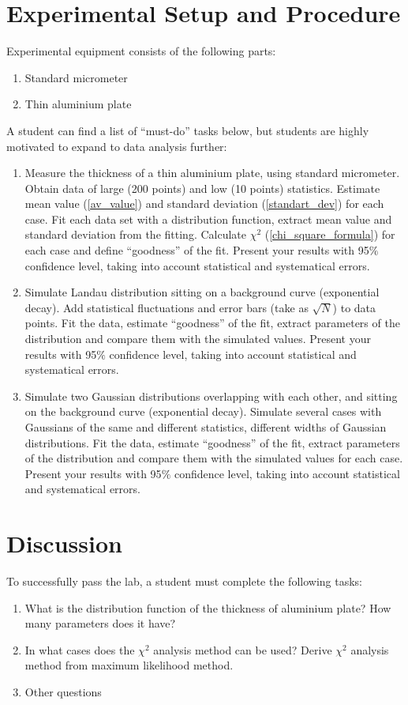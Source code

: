 \documentclass[12pt,a4paper]{report}
\begin{document}
\section{Experimental Setup and Procedure}
Experimental equipment consists of the following parts:
\begin{enumerate}
\item Standard micrometer
\item Thin aluminium plate
\end{enumerate}
A student can find a list of \enquote{must-do} tasks below, but students are highly motivated to expand to data analysis further:

\begin{enumerate}
\item Measure the thickness of a thin aluminium plate, using standard micrometer. Obtain data of large (200 points) and low (10 points) statistics. Estimate mean value (\ref{av_value}) and standard deviation (\ref{standart_dev}) for each case. Fit each data set with a distribution function, extract mean value and standard deviation from the fitting. Calculate $\chi^2$ (\ref{chi_square_formula}) for each case and define \enquote{goodness} of the fit. Present your results with 95$\%$ confidence level, taking into account statistical and systematical errors. 
\item Simulate Landau distribution sitting on a background curve (exponential decay). Add statistical fluctuations and error bars (take as $\sqrt{N}$) to data points. Fit the data, estimate \enquote{goodness} of the fit, extract parameters of the distribution and compare them with the simulated values. Present your results with 95$\%$ confidence level, taking into account statistical and systematical errors.
\item Simulate two Gaussian distributions overlapping with each other, and sitting on the background curve (exponential decay). Simulate several cases with Gaussians of the same and different statistics, different widths of Gaussian distributions. Fit the data, estimate \enquote{goodness} of the fit, extract parameters of the distribution and compare them with the simulated values for each case. Present your results with 95$\%$ confidence level, taking into account statistical and systematical errors.
\end{enumerate}

\section{Discussion}
To successfully pass the lab, a student must complete the following tasks:
\begin{enumerate}
\item What is the distribution function of the thickness of aluminium plate? How many parameters does it have? 
\item In what cases does the $\chi^2$ analysis method can be used? Derive $\chi^2$ analysis method from maximum likelihood method.
\item Other questions
\end{enumerate}
\end{document}
